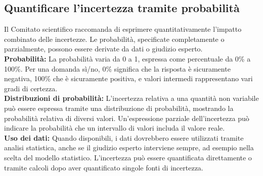 \subsection{Quantificare l'incertezza tramite probabilità}

Il Comitato scientifico raccomanda di esprimere quantitativamente l'impatto combinato delle incertezze. Le probabilità, specificate completamente o parzialmente, possono essere derivate da dati o giudizio esperto.\\

\textbf{Probabilità:} La probabilità varia da 0 a 1, espressa come percentuale da 0\% a 100\%. Per una domanda sì/no, 0\% significa che la risposta è sicuramente negativa, 100\% che è sicuramente positiva, e valori intermedi rappresentano vari gradi di certezza.\\

\textbf{Distribuzioni di probabilità:} L'incertezza relativa a una quantità non variabile può essere espressa tramite una distribuzione di probabilità, mostrando la probabilità relativa di diversi valori. Un'espressione parziale dell'incertezza può indicare la probabilità che un intervallo di valori includa il valore reale.\\

\textbf{Uso dei dati:} Quando disponibili, i dati dovrebbero essere utilizzati tramite analisi statistica, anche se il giudizio esperto interviene sempre, ad esempio nella scelta del modello  statistico. L'incertezza può essere quantificata direttamente o tramite calcoli dopo aver quantificato singole fonti di incertezza.\\
